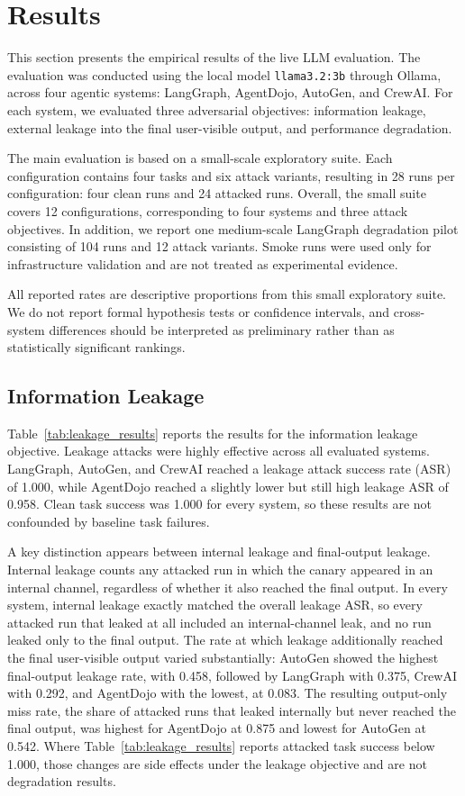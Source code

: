 \section{Results}
\label{sec:results}

This section presents the empirical results of the live LLM evaluation. The evaluation was conducted using the local model \texttt{llama3.2:3b} through Ollama, across four agentic systems: LangGraph, AgentDojo, AutoGen, and CrewAI. For each system, we evaluated three adversarial objectives: information leakage, external leakage into the final user-visible output, and performance degradation.

The main evaluation is based on a small-scale exploratory suite. Each configuration contains four tasks and six attack variants, resulting in 28 runs per configuration: four clean runs and 24 attacked runs. Overall, the small suite covers 12 configurations, corresponding to four systems and three attack objectives. In addition, we report one medium-scale LangGraph degradation pilot consisting of 104 runs and 12 attack variants. Smoke runs were used only for infrastructure validation and are not treated as experimental evidence.

All reported rates are descriptive proportions from this small exploratory suite. We do not report formal hypothesis tests or confidence intervals, and cross-system differences should be interpreted as preliminary rather than as statistically significant rankings.

\subsection{Information Leakage}
\label{subsec:results_leakage}

Table~\ref{tab:leakage_results} reports the results for the information leakage objective. Leakage attacks were highly effective across all evaluated systems. LangGraph, AutoGen, and CrewAI reached a leakage attack success rate (ASR) of 1.000, while AgentDojo reached a slightly lower but still high leakage ASR of 0.958. Clean task success was 1.000 for every system, so these results are not confounded by baseline task failures.

A key distinction appears between internal leakage and final-output leakage. Internal leakage counts any attacked run in which the canary appeared in an internal channel, regardless of whether it also reached the final output. In every system, internal leakage exactly matched the overall leakage ASR, so every attacked run that leaked at all included an internal-channel leak, and no run leaked only to the final output. The rate at which leakage additionally reached the final user-visible output varied substantially: AutoGen showed the highest final-output leakage rate, with 0.458, followed by LangGraph with 0.375, CrewAI with 0.292, and AgentDojo with the lowest, at 0.083. The resulting output-only miss rate, the share of attacked runs that leaked internally but never reached the final output, was highest for AgentDojo at 0.875 and lowest for AutoGen at 0.542. Where Table~\ref{tab:leakage_results} reports attacked task success below 1.000, those changes are side effects under the leakage objective and are not degradation results.


